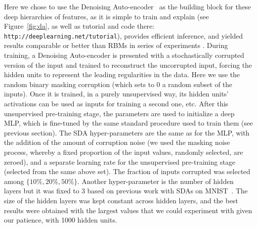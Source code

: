 \documentclass{article} %
\begin{document}
Here we chose to use the Denoising
Auto-encoder~\citep{VincentPLarochelleH2008} as the building block for
these deep hierarchies of features, as it is simple to train and
explain (see Figure~\ref{fig:da}, as well as 
tutorial and code there: {\tt http://deeplearning.net/tutorial}), 
provides efficient inference, and yielded results
comparable or better than RBMs in series of experiments
\citep{VincentPLarochelleH2008}. During training, a Denoising
Auto-encoder is presented with a stochastically corrupted version
of the input and trained to reconstruct the uncorrupted input,
forcing the hidden units to represent the leading regularities in
the data. Here we use the random binary masking corruption
(which sets to 0 a random subset of the inputs).
 Once it is trained, in a purely unsupervised way, 
its hidden units' activations can
be used as inputs for training a second one, etc.
After this unsupervised pre-training stage, the parameters
are used to initialize a deep MLP, which is fine-tuned by
the same standard procedure used to train them (see previous section).
The SDA hyper-parameters are the same as for the MLP, with the addition of the
amount of corruption noise (we used the masking noise process, whereby a
fixed proportion of the input values, randomly selected, are zeroed), and a
separate learning rate for the unsupervised pre-training stage (selected
from the same above set). The fraction of inputs corrupted was selected
among $\{10\%, 20\%, 50\%\}$. Another hyper-parameter is the number
of hidden layers but it was fixed to 3 based on previous work with
SDAs on MNIST~\citep{VincentPLarochelleH2008}. The size of the hidden
layers was kept constant across hidden layers, and the best results
were obtained with the largest values that we could experiment
with given our patience, with 1000 hidden units.

\vspace*{-1mm}
\end{document}
